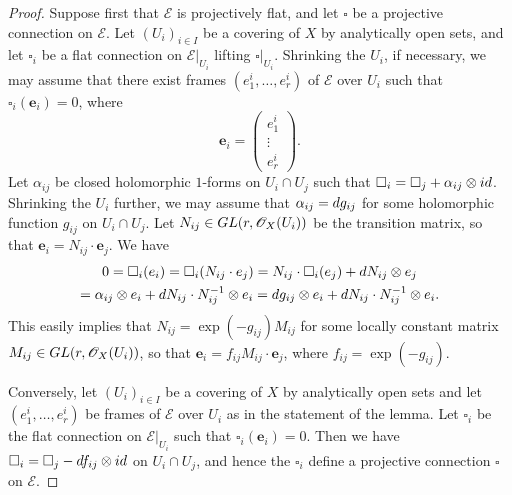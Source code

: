 \documentclass[10pt,a4paper]{amsart}
\newcommand{\dd}{\textup{d}}
\newcommand{\sE}{\mathscr{E}}
\newcommand{\sO}{\mathscr{O}}
\begin{document}
\begin{proof}
Suppose first that $\sE$ is projectively flat, and let $\square$ be a projective connection on $\sE$.
Let $(U_i)_{i \in I}$ be a covering of $X$ by analytically open sets, and let $\square_i$ be a flat connection on $\sE|_{U_i}$ lifting $\square|_{U_i}$. Shrinking the $U_i$, if necessary, we may assume that there exist frames
$(e_1^i,\ldots,e_r^i)$ of $\sE$ over $U_i$ such that $\square_i(\textbf{e}_i)=0$, where 
\[
\textbf{e}_i = 
\begin{pmatrix}
e_1^i \\
\vdots \\
e_r^i
\end{pmatrix}
.
\]
Let $\alpha_{ij}$ be closed holomorphic $1$-forms on $U_i\cap U_j$ such that $\square_i=\square_j+\alpha_{ij}\otimes \textup{id}$. Shrinking the $U_i$ further, we may assume that $\alpha_{ij}=\dd g_{ij}$ for some holomorphic function $g_{ij}$ on $U_i\cap U_j$. Let $N_{ij}\in \textup{GL}(r,\sO_X(U_i))$ be the transition matrix, so that $\textbf{e}_i=N_{ij} \cdot \textbf{e}_j$. We have
\begin{multline*}
0 = \square_i (\textbf{e}_i) = \square_i (N_{ij} \cdot \textbf{e}_j) = N_{ij} \cdot \square_i(\textbf{e}_j) + \dd N_{ij} \otimes \textbf{e}_j \\ = \alpha_{ij} \otimes \textbf{e}_i + \dd N_{ij}\cdot N_{ij}^{-1} \otimes \textbf{e}_i = \dd g_{ij} \otimes \textbf{e}_i + \dd N_{ij}\cdot N_{ij}^{-1} \otimes \textbf{e}_i.
\end{multline*}
This easily implies that $N_{ij}=\exp(-g_{ij}) M_{ij}$ for some locally constant matrix $M_{ij} \in \textup{GL}(r,\sO_X(U_i))$, so that $\textbf{e}_i= f_{ij} M_{ij} \cdot \textbf{e}_j$, where $f_{ij}=\exp(-g_{ij})$. 

Conversely, let $(U_i)_{i \in I}$ be a covering of $X$ by analytically open sets and let $(e_1^i,\ldots,e_r^i)$ be frames of $\sE$ over $U_i$ as in the statement of the lemma. Let $\square_i$ be the flat connection on $\sE|_{U_i}$ such that $\square_i (\textbf{e}_i)=0$. Then we have $\square_i=\square_j-\dd f_{ij}\otimes \textup{id}$ on $U_i \cap U_j$, and hence the $\square_i$ define a projective connection $\square$ on $\sE$.
\end{proof}
\end{document}
